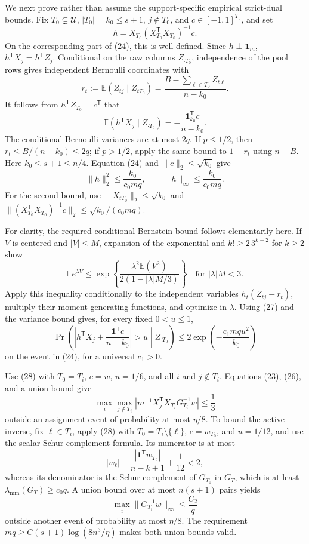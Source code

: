 We next prove rather than assume the support-specific empirical strict-dual bounds.  Fix \(T_0\subsetneq\mathcal U\), \(|T_0|=k_0\le s+1\), \(j\notin T_0\), and \(c\in[-1,1]^{T_0}\), and set
\[
 h=X_{T_0}(X_{T_0}^{\mathsf T}X_{T_0})^{-1}c. \tag{25}
\]
On the corresponding part of (24), this is well defined.  Since \(h\perp\mathbf1_m\), \(h^{\mathsf T}X_j=h^{\mathsf T}Z_j\).  Conditional on the raw columns \(Z_{\cdot T_0}\), independence of the pool rows gives independent Bernoulli coordinates with
\[
 r_t:=\mathbb E(Z_{tj}\mid Z_{tT_0})
 =\frac{B-\sum_{\ell\in T_0}Z_{t\ell}}{n-k_0}.
\]
It follows from \(h^{\mathsf T}Z_{T_0}=c^{\mathsf T}\) that
\[
 \mathbb E(h^{\mathsf T}X_j\mid Z_{\cdot T_0})
 =-\frac{\mathbf1_{k_0}^{\mathsf T}c}{n-k_0}. \tag{26}
\]
The conditional Bernoulli variances are at most \(2q\).  If \(p\le1/2\), then \(r_t\le B/(n-k_0)\le2q\); if \(p>1/2\), apply the same bound to \(1-r_t\) using \(n-B\).  Here \(k_0\le s+1\le n/4\).  Equation (24) and \(\lVert c\rVert_2\le\sqrt{k_0}\) give
\[
 \lVert h\rVert_2^2\le\frac{k_0}{c_0mq},
 \qquad
 \lVert h\rVert_\infty\le\frac{k_0}{c_0mq}. \tag{27}
\]
For the second bound, use \(\lVert X_{tT_0}\rVert_2\le\sqrt{k_0}\) and
\(\lVert(X_{T_0}^{\mathsf T}X_{T_0})^{-1}c\rVert_2\le\sqrt{k_0}/(c_0mq)\).

For clarity, the required conditional Bernstein bound follows elementarily here.  If \(V\) is centered and \(|V|\le M\), expansion of the exponential and \(k!\ge2\,3^{k-2}\) for \(k\ge2\) show
\[
 \mathbb E e^{\lambda V}
 \le\exp\!\left\{\frac{\lambda^2\mathbb E(V^2)}{2(1-|\lambda|M/3)}\right\}
 \quad\text{for }|\lambda|M<3.
\]
Apply this inequality conditionally to the independent variables
\(h_t(Z_{tj}-r_t)\), multiply their moment-generating functions, and optimize in \(\lambda\).  Using (27) and the variance bound gives, for every fixed \(0<u\le1\),
\[
 \Pr\!\left(
  \left|h^{\mathsf T}X_j+\frac{\mathbf1^{\mathsf T}c}{n-k_0}\right|>u
  \middle|Z_{\cdot T_0}\right)
 \le2\exp\!\left(-\frac{c_1mqu^2}{k_0}\right) \tag{28}
\]
on the event in (24), for a universal \(c_1>0\).

Use (28) with \(T_0=T_i\), \(c=w\), \(u=1/6\), and all \(i\) and \(j\notin T_i\).  Equations (23), (26), and a union bound give
\[
 \max_i\max_{j\notin T_i}
 \left|m^{-1}X_j^{\mathsf T}X_{T_i}G_{T_i}^{-1}w\right|
 \le\frac13 \tag{29}
\]
outside an assignment event of probability at most \(\eta/8\).  To bound the active inverse, fix \(\ell\in T_i\), apply (28) with \(T_0=T_i\setminus\{\ell\}\), \(c=w_{T_0}\), and \(u=1/12\), and use the scalar Schur-complement formula.  Its numerator is at most
\[
 |w_\ell|+\frac{|\mathbf1^{\mathsf T}w_{T_0}|}{n-k+1}+\frac1{12}<2,
\]
whereas its denominator is the Schur complement of \(G_{T_0}\) in \(G_T\), which is at least \(\lambda_{\min}(G_T)\ge c_0q\).  A union bound over at most \(n(s+1)\) pairs yields
\[
 \max_i\lVert G_{T_i}^{-1}w\rVert_\infty\le\frac{C_2}{q} \tag{30}
\]
outside another event of probability at most \(\eta/8\).  The requirement
\(mq\ge C(s+1)\log(8n^3/\eta)\) makes both union bounds valid.

